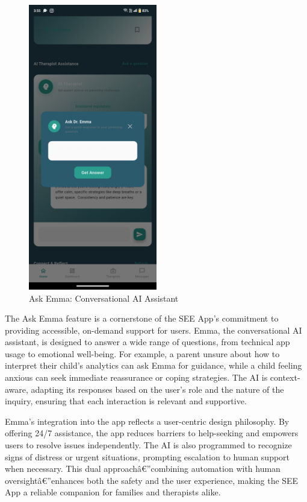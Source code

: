 ﻿\documentclass[12pt,a4paper]{article}
\begin{document}
\begin{figure}[H]
    \centering
    \includegraphics[width=0.5\textwidth]{Screenshots/askemma.png}
    \caption{Ask Emma: Conversational AI Assistant}
    \label{fig:ask-emma}
\end{figure}
The Ask Emma feature is a cornerstone of the SEE App's commitment to providing accessible, on-demand support for users. Emma, the conversational AI assistant, is designed to answer a wide range of questions, from technical app usage to emotional well-being. For example, a parent unsure about how to interpret their child's analytics can ask Emma for guidance, while a child feeling anxious can seek immediate reassurance or coping strategies. The AI is context-aware, adapting its responses based on the user's role and the nature of the inquiry, ensuring that each interaction is relevant and supportive.

Emma's integration into the app reflects a user-centric design philosophy. By offering 24/7 assistance, the app reduces barriers to help-seeking and empowers users to resolve issues independently. The AI is also programmed to recognize signs of distress or urgent situations, prompting escalation to human support when necessary. This dual approachâ€”combining automation with human oversightâ€”enhances both the safety and the user experience, making the SEE App a reliable companion for families and therapists alike.
\end{document}
